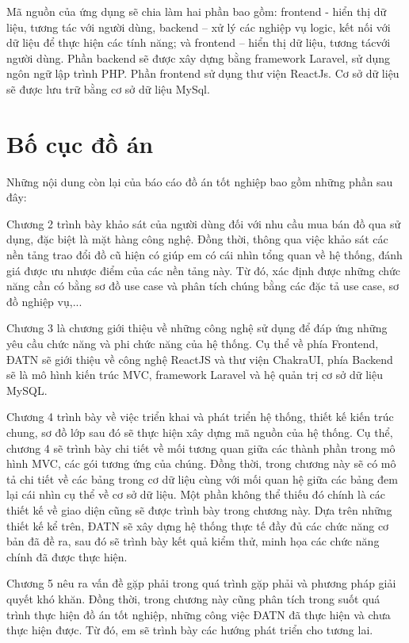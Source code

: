 \documentclass[../DoAn.tex]{subfiles}
\begin{document}
Mã nguồn của ứng dụng sẽ chia làm hai phần bao gồm: frontend - hiển thị dữ liệu, tương tác với người dùng, backend – xử lý các nghiệp vụ logic, kết nối với dữ liệu để thực hiện các tính năng; và frontend – hiển thị dữ liệu, tương tácvới người dùng. Phần backend sẽ được xây dựng bằng framework Laravel, sử dụng ngôn ngữ lập trình PHP. Phần frontend sử dụng thư viện ReactJs. Cơ sở dữ liệu sẽ được lưu trữ bằng cơ sở dữ liệu MySql.

\section{Bố cục đồ án}
\label{section:1.4}
Những nội dung còn lại của báo cáo đồ án tốt nghiệp bao gồm những phần sau đây:

Chương 2 trình bày khảo sát của người dùng đối với nhu cầu mua bán đồ qua sử dụng, đặc biệt là mặt hàng công nghệ. Đồng thời, thông qua việc khảo sát các nền tảng trao đổi đồ cũ hiện có giúp em có cái nhìn tổng quan về hệ thống, đánh giá được ưu nhược điểm của các nền tảng này. Từ đó, xác định được những chức năng cần có bằng sơ đồ use case và phân tích chúng bằng các đặc tả use case, sơ đồ nghiệp vụ,...  

Chương 3 là chương giới thiệu về những công nghệ sử dụng để đáp ứng những yêu cầu chức năng và phi chức năng của hệ thống. Cụ thể về phía Frontend, ĐATN sẽ giới thiệu về công nghệ ReactJS và thư viện ChakraUI, phía Backend sẽ là mô hình kiến trúc MVC, framework Laravel và hệ quản trị cơ sở dữ liệu MySQL.

Chương 4 trình bày về việc triển khai và phát triển hệ thống, thiết kế kiến trúc chung, sơ đồ lớp sau đó sẽ thực hiện xây dựng mã nguồn của hệ thống. Cụ thể, chương 4 sẽ trình bày chi tiết về mối tương quan giữa các thành phần trong mô hình MVC, các gói tương ứng của chúng. Đồng thời, trong chương này sẽ có mô tả chi tiết về các bảng trong cơ dữ liệu cùng với mối quan hệ giữa các bảng đem lại cái nhìn cụ thể về cơ sở dữ liệu. Một phần không thể thiếu đó chính là các thiết kế về giao diện cũng sẽ được trình bày trong chương này. Dựa trên những thiết kế kể trên, ĐATN sẽ xây dựng hệ thống thực tế đầy đủ các chức năng cơ bản đã đề ra, sau đó sẽ trình bày kết quả kiểm thử, minh họa các chức năng chính đã được thực hiện.

Chương 5 nêu ra vấn đề gặp phải trong quá trình gặp phải và phương pháp giải quyết khó khăn. Đồng thời, trong chương này cũng phân tích trong suốt quá trình thực hiện đồ án tốt nghiệp, những công việc ĐATN đã thực hiện và chưa thực hiện được. Từ đó, em sẽ trình bày các hướng phát triển cho tương lai.
\end{document}

